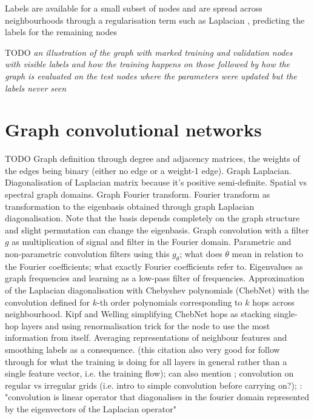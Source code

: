 Labels are available for a small subset of nodes and are spread across neighbourhoods through a regularisation term such as Laplacian \cite{kipf2017semi}, predicting the labels for the remaining nodes

TODO \textit{an illustration of the graph with marked training and validation nodes with visible labels and how the training happens on those followed by how the graph is evaluated on the test nodes where the parameters were updated but the labels never seen}


\section{Graph convolutional networks}
\label{training-gcn}
TODO Graph definition through degree and adjacency matrices, the weights of the edges being binary (either no edge or a weight-1 edge). Graph Laplacian. Diagonalisation of Laplacian matrix because it's positive semi-definite. Spatial vs spectral graph domains. Graph Fourier transform. Fourier transform as transformation to the eigenbasis obtained through graph Laplacian diagonalisation. Note that the basis depends completely on the graph structure and slight permutation can change the eigenbasis. Graph convolution with a filter $g$ as multiplication of signal and filter in the Fourier domain. Parametric and non-parametric convolution filters using this $g_\theta$; what does $\theta$ mean in relation to the Fourier coefficients; what exactly Fourier coefficients refer to. Eigenvalues as graph frequencies and learning as a low-pass filter of frequencies. Approximation of the Laplacian diagonalisation with Chebyshev polynomials (ChebNet) with the convolution defined for $k$-th order polynomials corresponding to $k$ hops across neighbourhood. \cite{defferrard2016convolutional} Kipf and Welling simplifying ChebNet hops as stacking single-hop layers and using renormalisation trick for the node to use the most information from itself. \cite{kipf2017semi} Averaging representations of neighbour features and smoothing labels as a consequence. \cite{wu2019simplifying} (this citation also very good for follow through for what the training is doing for all layers in general rather than a single feature vector, i.e. the training flow); can also mention \cite{wu2019comprehensive}; convolution on regular vs irregular grids (i.e. intro to simple convolution before carrying on?); \cite{defferrard2016convolutional}: "convolution is linear operator that diagonalises in the fourier domain represented by the eigenvectors of the Laplacian operator"




